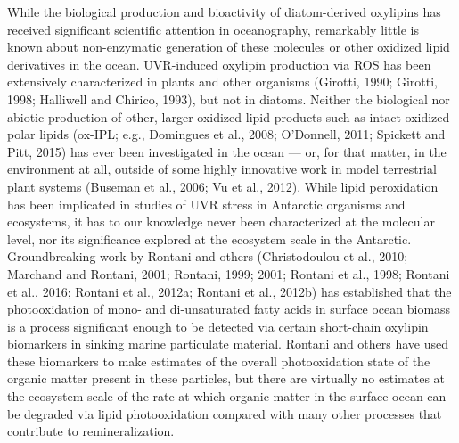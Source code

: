 While the biological production and bioactivity of diatom-derived oxylipins has received significant scientific attention in oceanography, remarkably little is known about non-enzymatic generation of these molecules or other oxidized lipid derivatives in the ocean. UVR-induced oxylipin production via ROS has been extensively characterized in plants and other organisms (Girotti, 1990; Girotti, 1998; Halliwell and Chirico, 1993), but not in diatoms. Neither the biological nor abiotic production of other, larger oxidized lipid products such as intact oxidized polar lipids (ox-IPL; e.g., Domingues et al., 2008; O'Donnell, 2011; Spickett and Pitt, 2015) has ever been investigated in the ocean --- or, for that matter, in the environment at all, outside of some highly innovative work in model terrestrial plant systems (Buseman et al., 2006; Vu et al., 2012). While lipid peroxidation has been implicated in studies of UVR stress in Antarctic organisms and ecosystems, it has to our knowledge never been characterized at the molecular level, nor its significance explored at the ecosystem scale in the Antarctic. Groundbreaking work by Rontani and others (Christodoulou et al., 2010; Marchand and Rontani, 2001; Rontani, 1999; 2001; Rontani et al., 1998; Rontani et al., 2016; Rontani et al., 2012a; Rontani et al., 2012b) has established that the photooxidation of mono- and di-unsaturated fatty acids in surface ocean biomass is a process significant enough to be detected via certain short-chain oxylipin biomarkers in sinking marine particulate material. Rontani and others have used these biomarkers to make estimates of the overall photooxidation state of the organic matter present in these particles, but there are virtually no estimates at the ecosystem scale of the rate at which organic matter in the surface ocean can be degraded via lipid photooxidation compared with many other processes that contribute to remineralization.

